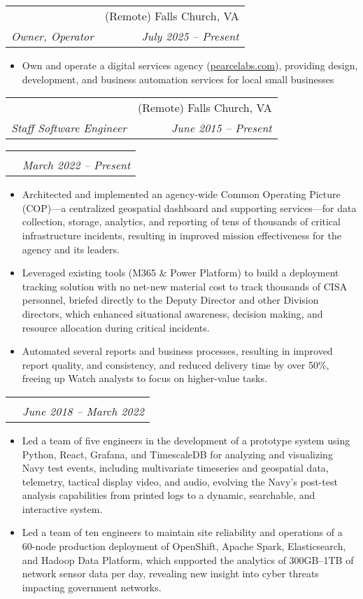 \documentclass[letterpaper,11pt]{article}
\makeatletter
\newcommand{\resumeSubheading}[4]{
  \begin{tabular*}{\textwidth}[t]{l@{\extracolsep{\fill}}r}
    \intersemibold{#1} & {\small#2} \\
    \color{lighter}\interlight\textit{\small#3} & \color{lighter}\interlight\textit{\small#4} \\
  \end{tabular*}
}
\newcommand{\resumeSubSubheading}[3]{
  \vspace{8pt}
  \begin{tabular*}{\textwidth}{l@{\extracolsep{\fill}}r}
    \intersemibold{#1} & \\
    \color{lighter}\interlight{\small#3} & \color{lighter}\interlight\textit{\small #2}\\
  \end{tabular*}
}
\newcommand{\resumeItemListStart}{
\begin{itemize}[leftmargin=20pt]}
\newcommand{\resumeItemListEnd}{
\end{itemize}}
\makeatother
\begin{document}
\resumeSubheading
{Pearce Labs, LLC.}{(Remote) Falls Church, VA}
{Owner, Operator}{July 2025 -- Present}
\resumeItemListStart
\item Own and operate a digital services agency (\href{https://pearcelabs.com}{pearcelabs.com}), providing design, development, and business automation services for local small businesses
\resumeItemListEnd

\vspace{16pt}
\resumeSubheading
{XOR Security}{(Remote) Falls Church, VA}
{Staff Software Engineer}{June 2015 -- Present}

\vspace{8pt}
\resumeSubSubheading{Senior Data Scientist \& Solutions Architect}{March 2022 -- Present}{CISA, Integrated Operations Division}
\resumeItemListStart
\item Architected and implemented an agency-wide Common Operating Picture (COP)—a centralized geospatial dashboard and supporting services—for data collection, storage, analytics, and reporting of tens of thousands of critical infrastructure incidents, resulting in improved mission effectiveness for the agency and its leaders.
\item Leveraged existing tools (M365 \& Power Platform) to build a deployment tracking solution with no net-new material cost to track thousands of CISA personnel, briefed directly to the Deputy Director and other Division directors, which enhanced situational awareness, decision making, and resource allocation during critical incidents.
\item Automated several reports and business processes, resulting in improved report quality, and consistency, and reduced delivery time by over 50\%, freeing up Watch analysts to focus on higher-value tasks.
\resumeItemListEnd

\resumeSubSubheading{Senior Software Engineer \& Project Lead}{June 2018 -- March 2022}{Department of the Navy \& CISA}
\resumeItemListStart
\item Led a team of five engineers in the development of a prototype system using Python, React, Grafana, and TimescaleDB for analyzing and visualizing Navy test events, including multivariate timeseries and geospatial data, telemetry, tactical display video, and audio, evolving the Navy's post-test analysis capabilities from printed logs to a dynamic, searchable, and interactive system.
\item Led a team of ten engineers to maintain site reliability and operations of a 60-node production deployment of OpenShift, Apache Spark, Elasticsearch, and Hadoop Data Platform, which supported the analytics of 300GB--1TB of network sensor data per day, revealing new insight into cyber threats impacting government networks.
\resumeItemListEnd
\end{document}
